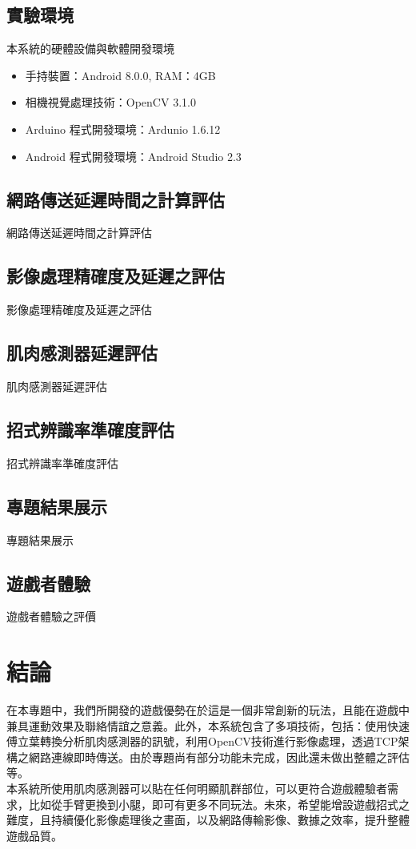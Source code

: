 \documentclass[12pt]{article}  %
\theoremstyle{plain}
\begin{document}
\subsection{實驗環境}
本系統的硬體設備與軟體開發環境
\begin{itemize}
\item 手持裝置：Android 8.0.0, RAM：4GB
\item 相機視覺處理技術：OpenCV 3.1.0
\item Arduino 程式開發環境：Ardunio 1.6.12
\item Android 程式開發環境：Android Studio 2.3
\end{itemize}

\subsection{網路傳送延遲時間之計算評估}
網路傳送延遲時間之計算評估

\subsection{影像處理精確度及延遲之評估}
影像處理精確度及延遲之評估

\subsection{肌肉感測器延遲評估}
肌肉感測器延遲評估

\subsection{招式辨識率準確度評估}
招式辨識率準確度評估

\subsection{專題結果展示}
專題結果展示

\subsection{遊戲者體驗}
遊戲者體驗之評價
\newpage

\section{結論}
在本專題中，我們所開發的遊戲優勢在於這是一個非常創新的玩法，且能在遊戲中兼具運動效果及聯絡情誼之意義。此外，本系統包含了多項技術，包括：使用快速傅立葉轉換分析肌肉感測器的訊號，利用OpenCV技術進行影像處理，透過TCP架構之網路連線即時傳送。由於專題尚有部分功能未完成，因此還未做出整體之評估等。\\
\indent 本系統所使用肌肉感測器可以貼在任何明顯肌群部位，可以更符合遊戲體驗者需求，比如從手臂更換到小腿，即可有更多不同玩法。未來，希望能增設遊戲招式之難度，且持續優化影像處理後之畫面，以及網路傳輸影像、數據之效率，提升整體遊戲品質。\\
\newpage
\end{document}
